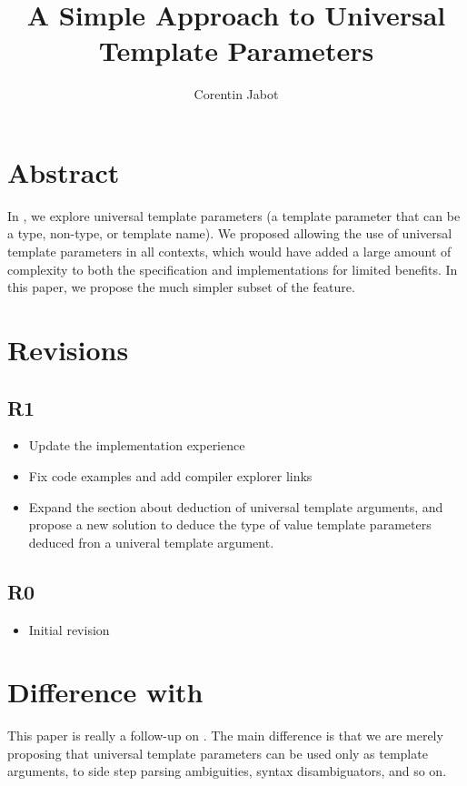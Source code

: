 \documentclass{wg21}
\title{A Simple Approach to Universal Template Parameters}
\author{Corentin Jabot}{corentin.jabot@gmail.com}
\begin{document}
\maketitle

\section{Abstract}
In , we explore universal template parameters (a template parameter that can be a type, non-type, or template name).
We proposed allowing the use of universal template parameters in all contexts, which would have added a large amount of complexity to both the specification and implementations
for limited benefits. In this paper, we propose the much simpler subset of the feature.


\section{Revisions}

\subsection{R1}

\begin{itemize}
    \item Update the implementation experience
    \item Fix code examples and add compiler explorer links
    \item Expand the section about deduction of universal template arguments, and propose a new solution to deduce the type of value template parameters deduced fron a univeral template argument.
\end{itemize}

\subsection{R0}

\begin{itemize}
    \item{Initial revision}
\end{itemize}


\section{Difference with }

This paper is really a follow-up on .
The main difference is that we are merely proposing that universal template parameters can be used only as template arguments, to side step parsing ambiguities, syntax disambiguators, and so on.
\end{document}
